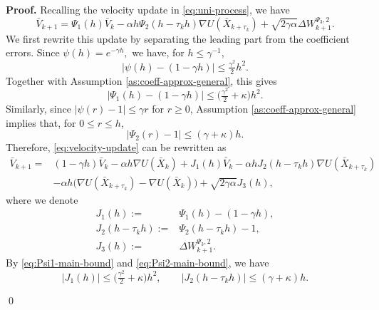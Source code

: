 \documentclass[12pt]{article}
\numberwithin{equation}{section}
\renewenvironment{proof}%
  {\begin{trivlist}%
   \item[]\ignorespaces}%
  {\qed\end{trivlist}}
\begin{document}
\begin{proof}
\textbf{Proof.}
Recalling the velocity update in \eqref{eq:uni-process}, we have
\begin{equation}
\label{eq:velocity-update}
\bar{V}_{k+1}
=
\Psi_1(h)\bar{V}_k
-
\alpha h\Psi_2(h-\tau_kh)
\nabla U(\bar{X}_{k+\tau_k})
+
\sqrt{2\gamma\alpha}
\Delta W_{k+1}^{\Psi_3,2}.
\end{equation}
We first rewrite this update by separating the leading part from the coefficient errors. Since
\(
\psi(h)=e^{-\gamma h},
\)
we have, for $h\leq\gamma^{-1}$,
\[
|\psi(h)-(1-\gamma h)|
\leq
\tfrac{\gamma^2}{2}h^2.
\]
Together with Assumption \ref{as:coeff-approx-general}, this gives
\begin{equation}
\label{eq:Psi1-main-bound}
\big|
\Psi_1(h)-(1-\gamma h)
\big|
\leq
\big(
\tfrac{\gamma^2}{2}
+
\kappa
\big)h^2.
\end{equation}
Similarly, since $|\psi(r)-1|\leq\gamma r$ for $r\geq0$, Assumption \ref{as:coeff-approx-general} implies that, for $0\leq r\leq h$,
\begin{equation}
\label{eq:Psi2-main-bound}
\big|
\Psi_2(r)-1
\big|
\leq
(\gamma+\kappa)h.
\end{equation}
Therefore, \eqref{eq:velocity-update} can be rewritten as
\begin{equation}
\label{eq:velocity-decomposition-new}
\begin{aligned}
\bar{V}_{k+1}
=&
(1-\gamma h)\bar{V}_k
-
\alpha h\nabla U(\bar{X}_k)
+
J_1(h)\bar{V}_k
-
\alpha h
J_2(h-\tau_kh)
\nabla U(\bar{X}_{k+\tau_k})
\\    &
-
\alpha h
\Big(
\nabla U(\bar{X}_{k+\tau_k})
-
\nabla U(\bar{X}_k)
\Big)
+
\sqrt{2\gamma\alpha}
J_3(h),
\end{aligned}
\end{equation}
where we denote
\begin{equation}
\label{eq:velocity-J-def}
\begin{aligned}
J_1(h)
:=&
\Psi_1(h)-(1-\gamma h),
\\
J_2(h-\tau_kh)
:=&
\Psi_2(h-\tau_kh)-1,
\\
J_3(h)
:=&
\Delta W_{k+1}^{\Psi_3,2}.
\end{aligned}
\end{equation}
By \eqref{eq:Psi1-main-bound} and \eqref{eq:Psi2-main-bound}, we have
\begin{equation}
\label{eq:velocity-I-basic-bound}
|J_1(h)|
\leq
\big(
\tfrac{\gamma^2}{2}
+
\kappa
\big)h^2,
\qquad
|J_2(h-\tau_kh)|
\leq
(\gamma+\kappa)h.
\end{equation}

\end{proof}
\end{document}
